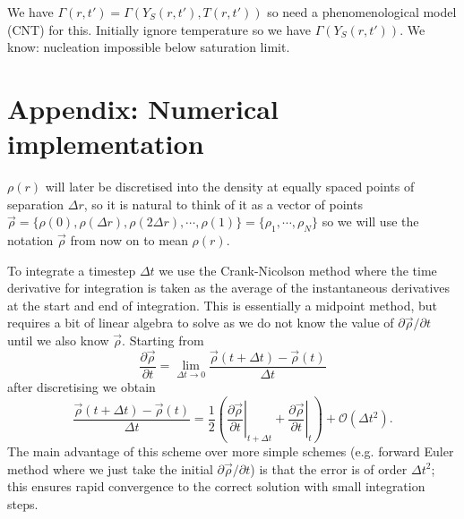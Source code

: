 \documentclass[11pt,twoside]{report}
\begin{document}
We have $\Gamma(r,t') = \Gamma(Y_S(r,t'), T(r,t'))$ so need a phenomenological model (CNT) for this.
Initially ignore temperature so we have $\Gamma(Y_S(r,t'))$.
We know: nucleation impossible below saturation limit.

\section*{Appendix: Numerical implementation}

$\rho(r)$ will later be discretised into the density at equally spaced points of separation $\Delta r$, so it is natural to think of it as a vector of points $\vec{\rho} = \{\rho(0), \rho(\Delta r), \rho(2 \Delta r), \cdots, \rho(1)\} = \{\rho_1, \cdots, \rho_N\}$ so we will use the notation $\vec{\rho}$ from
now on to mean $\rho(r)$.

To integrate a timestep $\Delta t$ we use the Crank-Nicolson \cite{Crank1947} method where the time derivative for integration is taken as the average of the instantaneous derivatives at the start and end of integration.
This is essentially a midpoint method, but requires a bit of linear algebra to solve as we do not know the value of $\partial \vec{\rho} / \partial t$ until we also know $\vec{\rho}$.
Starting from
\begin{equation}
  \frac{\partial \vec{\rho}}{\partial t} =
  \lim_{\Delta t \to 0} \frac{\vec{\rho}(t + \Delta t) - \vec{\rho}(t)}{\Delta t}
\end{equation}
after discretising we obtain
\begin{equation}
  \frac{\vec{\rho}(t + \Delta t) - \vec{\rho}(t)}{\Delta t}
  =
  \frac{1}{2}
  \left(
  \left. \frac{\partial \vec{\rho}}{\partial t} \right|_{t + \Delta t}
  +
  \left. \frac{\partial \vec{\rho}}{\partial t} \right|_t
  \right)
  + \mathcal{O}(\Delta t^2).
\end{equation}
The main advantage of this scheme over more simple schemes (e.g. forward Euler method where we just take the initial $\partial \vec{\rho} / \partial t$) is that the error is of order $\Delta t^2$; this ensures rapid convergence to the correct solution with small integration steps.
\end{document}
